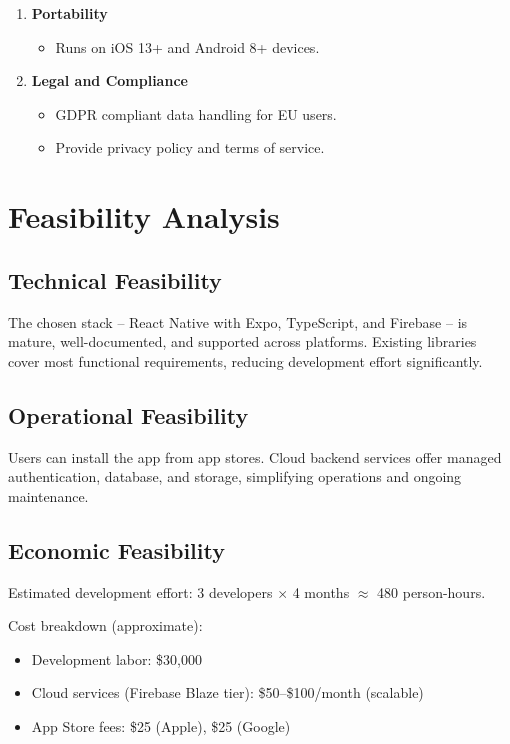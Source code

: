 \documentclass[12pt,a4paper]{article}
\begin{document}
\begin{enumerate}[label=\textbf{NFR\arabic*:}, leftmargin=*, itemsep=0.5em]
  \item \textbf{Portability}
        \begin{itemize}
            \item Runs on iOS 13+ and Android 8+ devices.
        \end{itemize}

  \item \textbf{Legal and Compliance}
        \begin{itemize}
            \item GDPR compliant data handling for EU users.
            \item Provide privacy policy and terms of service.
        \end{itemize}

\end{enumerate}

\section{Feasibility Analysis}

\subsection{Technical Feasibility}
The chosen stack -- React Native with Expo, TypeScript, and Firebase -- is mature,
well-documented, and supported across platforms. Existing libraries cover most
functional requirements, reducing development effort significantly.

\subsection{Operational Feasibility}
Users can install the app from app stores. Cloud backend services offer managed
authentication, database, and storage, simplifying operations and ongoing maintenance.

\subsection{Economic Feasibility}
Estimated development effort: 3 developers $\times$ 4 months $\approx$ 480 person-hours.

\medskip
\noindent Cost breakdown (approximate):
\begin{itemize}
  \item Development labor: \$30,000
  \item Cloud services (Firebase Blaze tier): \$50--\$100/month (scalable)
  \item App Store fees: \$25 (Apple), \$25 (Google)
\end{itemize}
\end{document}
